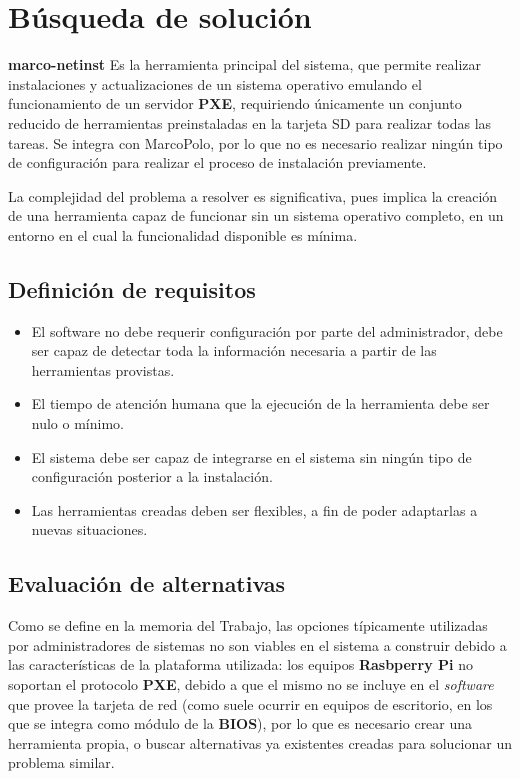 \documentclass{article}
\begin{document}
\section{Búsqueda de solución}

\textbf{marco-netinst} Es la herramienta principal del sistema, que permite realizar instalaciones y actualizaciones de un sistema operativo emulando el funcionamiento de un servidor \textbf{PXE}, requiriendo únicamente un conjunto reducido de herramientas preinstaladas en la tarjeta SD para realizar todas las tareas. Se integra con MarcoPolo, por lo que no es necesario realizar ningún tipo de configuración para realizar el proceso de instalación previamente.

La complejidad del problema a resolver es significativa, pues implica la creación de una herramienta capaz de funcionar sin un sistema operativo completo, en un entorno en el cual la funcionalidad disponible es mínima.
\subsection{Definición de requisitos}

\begin{itemize}
\item El software no debe requerir configuración por parte del administrador, debe ser capaz de detectar toda la información necesaria a partir de las herramientas provistas.
\item El tiempo de atención humana que la ejecución de la herramienta debe ser nulo o mínimo.
\item El sistema debe ser capaz de integrarse en el sistema sin ningún tipo de configuración posterior a la instalación.
\item Las herramientas creadas deben ser flexibles, a fin de poder adaptarlas a nuevas situaciones.
\end{itemize}

\subsection{Evaluación de alternativas}

Como se define en la memoria del Trabajo, las opciones típicamente utilizadas por administradores de sistemas no son viables en el sistema a construir debido a las características de la plataforma utilizada: los equipos \textbf{Rasbperry Pi} no soportan el protocolo \textbf{PXE}, debido a que el mismo no se incluye en el \textit{software} que provee la tarjeta de red (como suele ocurrir en equipos de escritorio, en los que se integra como módulo de la \textbf{BIOS}), por lo que es necesario crear una herramienta propia, o buscar alternativas ya existentes creadas para solucionar un problema similar.
\end{document}
